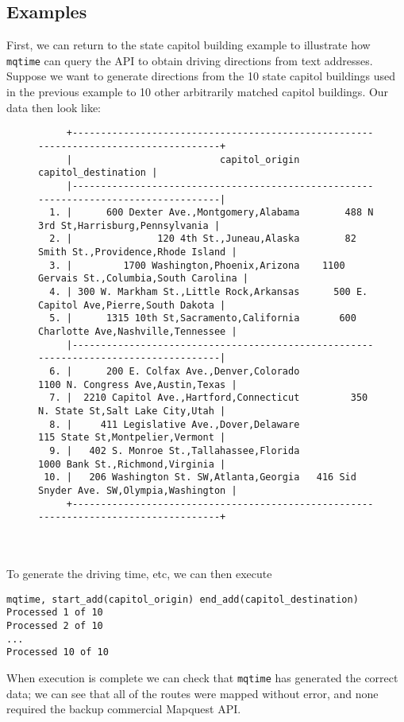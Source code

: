 \documentclass[11pt]{article}
\begin{document}
\subsection{Examples}
First, we can return to the state capitol building example to illustrate how \verb|mqtime| can query the API to obtain driving directions from text addresses. Suppose we want to generate directions from the 10 state capitol buildings used in the previous example to 10 other arbitrarily matched capitol buildings. Our data then look like:
\begin{figure}[ht]
{\footnotesize
\begin{verbatim}
     +-------------------------------------------------------------------------------------+
     |                          capitol_origin                         capitol_destination |
     |-------------------------------------------------------------------------------------|
  1. |      600 Dexter Ave.,Montgomery,Alabama        488 N 3rd St,Harrisburg,Pennsylvania |
  2. |               120 4th St.,Juneau,Alaska        82 Smith St.,Providence,Rhode Island |
  3. |         1700 Washington,Phoenix,Arizona    1100 Gervais St.,Columbia,South Carolina |
  4. | 300 W. Markham St.,Little Rock,Arkansas      500 E. Capitol Ave,Pierre,South Dakota |
  5. |      1315 10th St,Sacramento,California       600 Charlotte Ave,Nashville,Tennessee |
     |-------------------------------------------------------------------------------------|
  6. |      200 E. Colfax Ave.,Denver,Colorado           1100 N. Congress Ave,Austin,Texas |
  7. |  2210 Capitol Ave.,Hartford,Connecticut         350 N. State St,Salt Lake City,Utah |
  8. |     411 Legislative Ave.,Dover,Delaware             115 State St,Montpelier,Vermont |
  9. |   402 S. Monroe St.,Tallahassee,Florida             1000 Bank St.,Richmond,Virginia |
 10. |   206 Washington St. SW,Atlanta,Georgia   416 Sid Snyder Ave. SW,Olympia,Washington |
     +-------------------------------------------------------------------------------------+
\end{verbatim}
}
\end{figure}
\\ \\
To generate the driving time, etc, we can then execute
\begin{center}
\begin{verbatim}
mqtime, start_add(capitol_origin) end_add(capitol_destination)
Processed 1 of 10
Processed 2 of 10
...
Processed 10 of 10
\end{verbatim}
\end{center}
When execution is complete we can check that \verb|mqtime| has generated the correct data; we can see that all of the routes were mapped without error, and none required the backup commercial Mapquest API.
\end{document}
